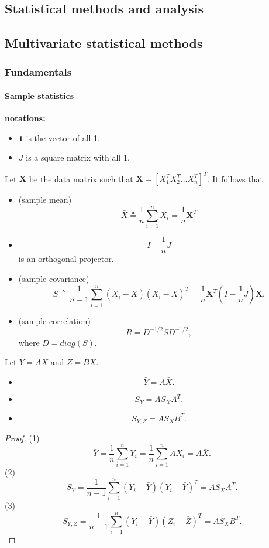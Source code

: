
\begin{refsection}
	\startcontents[chapters]	

\chapter{Statistical methods and analysis}\label{ch:statistical-models}
\section{Multivariate statistical methods}
\subsection{Fundamentals}
\subsubsection{Sample statistics}
\begin{mdframed}
	\textbf{notations:}
	\begin{itemize}
		\item $\bm{1}$ is the vector of all 1.
		\item $J$ is a square matrix with all 1.
	\end{itemize}
\end{mdframed}


\begin{lemma}\label{ch:statistical-models:th:SampleMeanSampleCovarianceOperator}
Let $\bm{X}$ be the data matrix such that $\bm{X} = [X_1^T X_2^T \dots X_n^T]^T$. It follows that	
\begin{itemize}
	\item (sample mean)$$\bar{X} \triangleq \frac{1}{n}\sum_{i=1}^n X_i = \frac{1}{n}\bm{X}^T$$
	\item $$I - \frac{1}{n}J$$
	is an orthogonal projector.
	\item (sample covariance) 
	$$S \triangleq \frac{1}{n-1}\sum_{i=1}^n (X_i - \bar{X})(X_i - \bar{X})^T = \frac{1}{n}\bm{X}^T(I- \frac{1}{n}J)\bm{X}.$$
	\item (sample correlation)
	$$R = D^{-1/2}SD^{-1/2},$$
	where $D = diag(S).$
\end{itemize}		
\end{lemma}



\begin{lemma}
Let $Y = AX$ and $Z = BX$. 
\begin{itemize}
	\item $$\bar{Y} = A\bar{X}.$$
	\item $$S_{Y} = AS_XA^T.$$
	\item $$S_{Y,Z} = AS_XB^T.$$
\end{itemize}	
\end{lemma}
\begin{proof}
(1)
$$\bar{Y} = \frac{1}{n}\sum_{i=1}^n Y_i = \frac{1}{n}\sum_{i=1}^n AX_i =  A\bar{X}.$$
(2)
$$S_{Y} = \frac{1}{n-1}\sum_{i=1}^n (Y_i - \bar{Y})(Y_i - \bar{Y})^T=AS_XA^T.$$
(3)
$$S_{Y,Z} = \frac{1}{n-1}\sum_{i=1}^n (Y_i - \bar{Y})(Z_i - \bar{Z})^T=AS_XB^T.$$


\end{proof}
\end{refsection}

